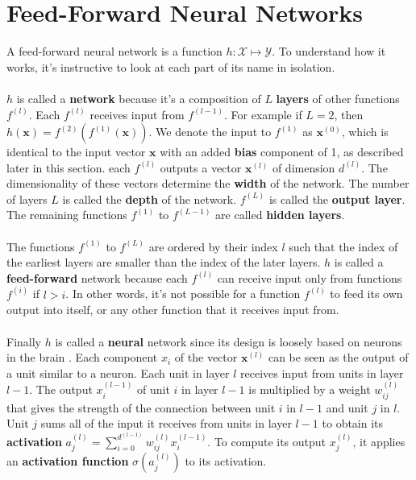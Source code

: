 \section{Feed-Forward Neural Networks}
A feed-forward neural network is a function $h: \mathcal{X} \mapsto \mathcal{Y}$. To understand how it works, it's instructive to look at each part of its name in isolation.
\\\\
$h$ is called a \textbf{network} because it's a composition of $L$ \textbf{layers} of other functions $f^{(l)}$. Each $f^{(l)}$ receives input from $f^{(l-1)}$. For example if $L = 2$, then $h(\mathbf{x}) = f^{(2)}(f^{(1)}(\mathbf{x}))$. We denote the input to $f^{(1)}$ as $\mathbf{x}^{(0)}$, which is identical to the input vector $\mathbf{x}$ with an added \textbf{bias} component of 1, as described later in this section. each $f^{(l)}$ outputs a vector $\mathbf{x}^{(l)}$ of dimension $d^{(l)}$. The dimensionality of these vectors determine the \textbf{width} of the network. The number of layers $L$ is called the \textbf{depth} of the network. $f^{(L)}$ is called the \textbf{output layer}. The remaining functions $f^{(1)}$ to $f^{(L-1)}$ are called \textbf{hidden layers}. 
\\\\
The functions $f^{(1)}$ to $f^{(L)}$ are ordered by their index $l$ such that the index of the earliest layers are smaller than the index of the later layers. $h$ is called a \textbf{feed-forward} network because each $f^{(l)}$ can receive input only from functions $f^{(i)}$ if $l > i$. In other words, it's not possible for a function $f^{(l)}$ to feed its own output into itself, or any other function that it receives input from.
\\\\
Finally $h$ is called a \textbf{neural} network since its design is loosely based on neurons in the brain \citep{goodfellow16}. Each component $x_i$ of the vector $\mathbf{x}^{(l)}$ can be seen as the output of a unit similar to a neuron. Each unit in layer $l$ receives input from units in layer $l-1$. The output $x^{(l-1)}_i$ of unit $i$ in layer $l-1$ is multiplied by a weight $w^{(l)}_{ij}$ that gives the strength of the connection between unit $i$ in $l-1$ and unit $j$ in $l$. Unit $j$ sums all of the input it receives from units in layer $l-1$ to obtain its \textbf{activation} $a^{(l)}_j = \sum_{i=0}^{d^{(l-1)}} w^{(l)}_{ij}x^{(l-1)}_{i}$. To compute its output $x^{(l)}_j$, it applies an \textbf{activation function} $\sigma(a^{(l)}_j)$ to its activation.

